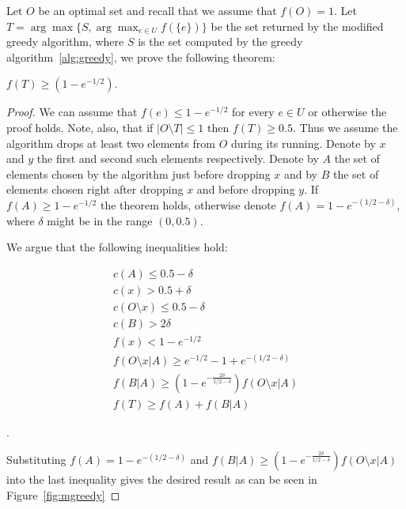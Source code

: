 Let $O$ be an optimal set and recall that we assume that $f(O) = 1$.
Let $T = \arg\max\{S, \displaystyle{\arg\max_{e \in U}}f(\{e\})\}$ 
be the set returned by the modified greedy algorithm, 
where $S$ is the set computed by the greedy algorithm~\ref{alg:greedy},
we prove the following theorem:

\begin{theorem}
$f(T) \geq (1 - e^{-1/2})$.
\end{theorem}

\begin{proof}
We can assume that $f(e) \leq 1 - e^{-1/2}$ for every $e \in U$ or otherwise the proof holds. 
Note, also, that if $|O \setminus T| \leq 1$ then $f(T) \geq 0.5$. 
Thus we assume the algorithm drops at least two elements from $O$ during its running. 
Denote by $x$ and $y$ the first and second such elements respectively.
Denote by $A$ the set of elements chosen by the algorithm just before dropping $x$ and by
$B$ the set of elements chosen right after dropping $x$ and before dropping $y$.
If $f(A) \geq 1 - e^{-1/2}$ the theorem holds, otherwise denote $f(A) = 1 - e^{-(1/2 - \delta)}$,
where $\delta$ might be in the range $(0, 0.5)$.  

We argue that the following inequalities hold:

\begin{align}
c(A) \leq 0.5 - \delta 
\\
c(x) > 0.5 + \delta
\\
c(O \setminus x) \leq 0.5 - \delta
\\
c(B) > 2\delta
\\
f(x) < 1 - e^{-1/2}
\\
\label{ineq:T}
f(O \setminus x | A) \geq e^{-1/2} - 1 + e^{-(1/2 - \delta)}
\\
\label{ineq:B}
f(B|A) \geq (1 - e^{-\frac{2\delta}{1/2 - \delta}})f(O \setminus x | A)
\\
f(T) \geq f(A) + f(B|A)
\end{align}

.

Substituting $f(A) = 1 - e^{-(1/2 - \delta)}$ 
and $f(B|A) \geq (1 - e^{-\frac{2\delta}{1/2 - \delta}})f(O \setminus x | A)$
into the last inequality gives the desired result as can be seen in Figure~\ref{fig:mgreedy}
\end{proof}

